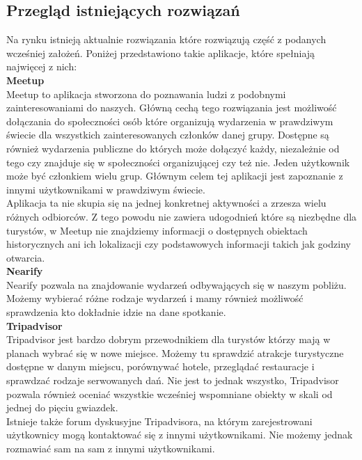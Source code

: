     \subsection{Przegląd istniejących rozwiązań}
    Na rynku istnieją aktualnie rozwiązania które rozwiązują część z podanych wcześniej założeń. Poniżej przedstawiono takie aplikacje, które spełniają najwięcej z nich: \\

    \textbf{Meetup} \\ 
    Meetup to aplikacja stworzona do poznawania ludzi z podobnymi zainteresowaniami do naszych. Główną cechą tego rozwiązania jest możliwość dołączania do społeczności osób które organizują wydarzenia w prawdziwym świecie dla wszystkich zainteresowanych członków danej grupy. Dostępne są również wydarzenia publiczne do których może dołączyć każdy, niezależnie od tego czy znajduje się w społeczności organizującej czy też nie. Jeden użytkownik może być członkiem wielu grup. Głównym celem tej aplikacji jest zapoznanie z innymi użytkownikami w prawdziwym świecie. \\
    Aplikacja ta nie skupia się na jednej konkretnej aktywności a zrzesza wielu różnych odbiorców. Z tego powodu nie zawiera udogodnień które są niezbędne dla turystów, w Meetup nie znajdziemy informacji o dostępnych obiektach historycznych ani ich lokalizacji czy podstawowych informacji takich jak godziny otwarcia. \\ 

    \textbf{Nearify} \\
    Nearify pozwala na znajdowanie wydarzeń odbywających się w naszym pobliżu. Możemy wybierać różne rodzaje wydarzeń i mamy również możliwość sprawdzenia kto dokładnie idzie na dane spotkanie. \\

    \textbf{Tripadvisor} \\ 
    Tripadvisor jest bardzo dobrym przewodnikiem dla turystów którzy mają w planach wybrać się w nowe miejsce. Możemy tu sprawdzić atrakcje turystyczne dostępne w danym miejscu, porównywać hotele, przeglądać restauracje i sprawdzać rodzaje serwowanych dań. Nie jest to jednak wszystko, Tripadvisor pozwala również oceniać wszystkie wcześniej wspomniane obiekty w skali od jednej do pięciu gwiazdek. \\
    Istnieje także forum dyskusyjne Tripadvisora, na którym zarejestrowani użytkownicy mogą kontaktować się z innymi użytkownikami. Nie możemy jednak rozmawiać sam na sam z innymi użytkownikami. \\

